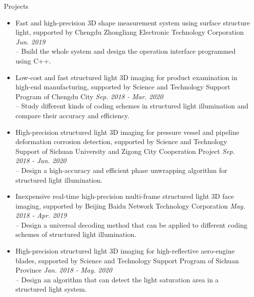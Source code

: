 \documentclass{resume} %
\begin{document}
\begin{rSection}{Projects}
	\begin{itemize}[leftmargin=*]
		\item Fast and high-precision 3D shape measurement system using surface structure light, supported by Chengdu Zhongliang Electronic Technology Corporation \hfill{\em Jun. 2019}\vspace{1.5mm}\\	
		-- Build the whole system and design the operation interface programmed using C++.
		
		\item  Low-cost and fast structured light 3D imaging for product examination in high-end manufacturing, supported by Science and Technology Support Program of Chengdu City 
		\hfill {\em Sep. 2018 - Mar. 2020}\vspace{1.5mm}\\
		-- Study different kinds of coding schemes in structured light illumination and compare their accuracy and efficiency.
		
		\item  High-precision structured light 3D imaging for pressure vessel and pipeline deformation corrosion detection, supported by Science and Technology Support of Sichuan University and Zigong City Cooperation Project \hfill {\em Sep. 2018 - Jan. 2020}\vspace{1.5mm}\\
		-- Design a high-accuracy and efficient phase unwrapping algorithm for structured light illumination.
		
		\item  Inexpensive real-time high-precision multi-frame structured light 3D face imaging, supported by Beijing Baidu Network Technology Corporation 
		\hfill {\em May. 2018 - Apr. 2019}\vspace{1.5mm}\\
		-- Design a universal decoding method that can be applied to different coding schemes of structured light illumination.
				
		\item  High-precision structured light 3D imaging for high-reflective aero-engine blades, supported by Science and Technology Support Program of Sichuan Province 
		\hfill {\em Jan. 2018 - May. 2020}\vspace{1.5mm}\\
		-- Design an algorithm that can detect the light saturation area in a structured light system.
		

\end{itemize}
\end{rSection}
\end{document}
